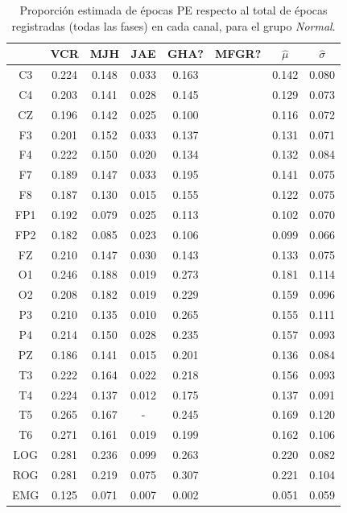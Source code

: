 \begin{table}
\centering
\begin{tabular}{c|ccccc|cc}
& VCR & MJH & JAE & GHA? & MFGR? & $\widehat{\mu}$ & $\widehat{\sigma}$ \\
\hline
 C3 & 0.224    & 0.148    & 0.033    & 0.163    && 0.142    & 0.080    \\
 C4 & 0.203    & 0.141    & 0.028    & 0.145    && 0.129    & 0.073    \\
 CZ & 0.196    & 0.142    & 0.025    & 0.100    && 0.116    & 0.072    \\
 F3 & 0.201    & 0.152    & 0.033    & 0.137    && 0.131    & 0.071    \\
 F4 & 0.222    & 0.150    & 0.020    & 0.134    && 0.132    & 0.084    \\
 F7 & 0.189    & 0.147    & 0.033    & 0.195    && 0.141    & 0.075    \\
 F8 & 0.187    & 0.130    & 0.015    & 0.155    && 0.122    & 0.075    \\
 FP1 & 0.192    & 0.079    & 0.025    & 0.113    && 0.102    & 0.070    \\
 FP2 & 0.182    & 0.085    & 0.023    & 0.106    && 0.099    & 0.066    \\
 FZ & 0.210    & 0.147    & 0.030    & 0.143    && 0.133    & 0.075    \\
 O1 & 0.246    & 0.188    & 0.019    & 0.273    && 0.181    & 0.114    \\
 O2 & 0.208    & 0.182    & 0.019    & 0.229    && 0.159    & 0.096    \\
 P3 & 0.210    & 0.135    & 0.010    & 0.265    && 0.155    & 0.111    \\
 P4 & 0.214    & 0.150    & 0.028    & 0.235    && 0.157    & 0.093    \\
 PZ & 0.186    & 0.141    & 0.015    & 0.201    && 0.136    & 0.084    \\
 T3 & 0.222    & 0.164    & 0.022    & 0.218    && 0.156    & 0.093    \\
 T4 & 0.224    & 0.137    & 0.012    & 0.175    && 0.137    & 0.091    \\
 T5 & 0.265    & 0.167    & -      & 0.245    && 0.169    & 0.120    \\
 T6 & 0.271    & 0.161    & 0.019    & 0.199    && 0.162    & 0.106    \\
 LOG & 0.281    & 0.236    & 0.099    & 0.263    && 0.220    & 0.082    \\
 ROG & 0.281    & 0.219    & 0.075    & 0.307    && 0.221    & 0.104    \\
 EMG & 0.125    & 0.071    & 0.007    & 0.002    && 0.051    & 0.059
\end{tabular}
\caption{Proporci\'on estimada de \'epocas PE respecto al total de \'epocas
registradas (todas las fases) en cada
canal, para el grupo \textit{Normal}.}
\label{gpo_NN_tot}
\end{table}

